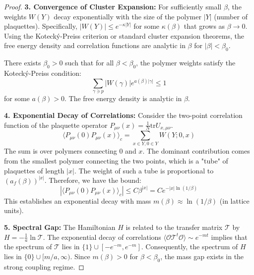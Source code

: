 \begin{proof}
\textbf{3. Convergence of Cluster Expansion:}
For sufficiently small $\beta$, the weights $W(Y)$ decay exponentially with the size of the polymer $|Y|$ (number of plaquettes). Specifically, $|W(Y)| \le e^{-\kappa |Y|}$ for some $\kappa(\beta)$ that grows as $\beta \to 0$.
Using the Kotecký-Preiss criterion or standard cluster expansion theorems, the free energy density and correlation functions are analytic in $\beta$ for $|\beta| < \beta_0$.

\begin{theorem}
\label{thm:cluster_convergence}
There exists $\beta_0 > 0$ such that for all $\beta < \beta_0$, the polymer weights satisfy the Kotecký-Preiss condition:
\begin{equation}
\sum_{\gamma \ni p} |W(\gamma)| e^{a(\beta)|\gamma|} \leq 1
\end{equation}
for some $a(\beta) > 0$. The free energy density is analytic in $\beta$.
\end{theorem}

\textbf{4. Exponential Decay of Correlations:}
Consider the two-point correlation function of the plaquette operator $P_{\mu\nu}(x) = \frac{1}{N} \text{tr} U_{x,\mu\nu}$.
\begin{equation}
\langle P_{\mu\nu}(0) P_{\mu\nu}(x) \rangle_c = \sum_{x \in Y, 0 \in Y} W(Y; 0, x)
\end{equation}
The sum is over polymers connecting $0$ and $x$. The dominant contribution comes from the smallest polymer connecting the two points, which is a "tube" of plaquettes of length $|x|$. The weight of such a tube is proportional to $(a_f(\beta))^{|x|}$.
Therefore, we have the bound:
\begin{equation}
|\langle P_{\mu\nu}(0) P_{\mu\nu}(x) \rangle_c| \le C \beta^{|x|} = C e^{-|x| \ln(1/\beta)}
\end{equation}
This establishes an exponential decay with mass $m(\beta) \approx \ln(1/\beta)$ (in lattice units).

\textbf{5. Spectral Gap:}
The Hamiltonian $H$ is related to the transfer matrix $\mathcal{T}$ by $H = -\frac{1}{a} \ln \mathcal{T}$. The exponential decay of correlations $\langle \mathcal{O} \mathcal{T}^t \mathcal{O} \rangle \sim e^{-mt}$ implies that the spectrum of $\mathcal{T}$ lies in $\{1\} \cup [-e^{-m}, e^{-m}]$. Consequently, the spectrum of $H$ lies in $\{0\} \cup [m/a, \infty)$. Since $m(\beta) > 0$ for $\beta < \beta_0$, the mass gap exists in the strong coupling regime.
\end{proof}

